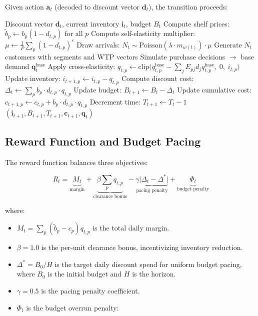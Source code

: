 \documentclass[11pt,a4paper]{article}
\begin{document}
Given action $\mathbf{a}_t$ (decoded to discount vector $\mathbf{d}_t$), the transition proceeds:

\begin{algorithm}[H]
\caption{Single-step transition dynamics}
\begin{algorithmic}[1]
\Require Discount vector $\mathbf{d}_t$, current inventory $\mathbf{i}_t$, budget $B_t$
\State Compute shelf prices: $\tilde{b}_p \gets b_p (1 - d_{t,p})$ for all $p$
\State Compute self-elasticity multiplier: $\mu \gets \frac{1}{P}\sum_p (1 - d_{t,p})^{\varepsilon}$
\State Draw arrivals: $N_t \sim \text{Poisson}(\lambda \cdot m_{w(t)}) \cdot \mu$
\State Generate $N_t$ customers with segments and WTP vectors
\State Simulate purchase decisions $\rightarrow$ base demand $\mathbf{q}^{\text{base}}_t$
\State Apply cross-elasticity: $q_{t,p} \gets \text{clip}\bigl(q^{\text{base}}_{t,p} - \sum_j E_{pj} d_j q^{\text{base}}_{t,p},\; 0,\; i_{t,p}\bigr)$
\State Update inventory: $i_{t+1,p} \gets i_{t,p} - q_{t,p}$
\State Compute discount cost: $\Delta_t \gets \sum_p b_p \cdot d_{t,p} \cdot q_{t,p}$
\State Update budget: $B_{t+1} \gets B_t - \Delta_t$
\State Update cumulative cost: $c_{t+1,p} \gets c_{t,p} + b_p \cdot d_{t,p} \cdot q_{t,p}$
\State Decrement time: $T_{t+1} \gets T_t - 1$
\State \Return $(\mathbf{i}_{t+1}, B_{t+1}, T_{t+1}, \mathbf{c}_{t+1}, \mathbf{q}_t)$
\end{algorithmic}
\end{algorithm}

\subsection{Reward Function and Budget Pacing}

The reward function balances three objectives:

\begin{equation}
\boxed{
R_t = \underbrace{M_t}_{\text{margin}} + \underbrace{\beta \sum_p q_{t,p}}_{\text{clearance bonus}} - \underbrace{\gamma \bigl|\Delta_t - \Delta^*\bigr|}_{\text{pacing penalty}} + \underbrace{\Phi_t}_{\text{budget penalty}}
}
\label{eq:reward}
\end{equation}

where:
\begin{itemize}
    \item $M_t = \sum_p (\tilde{b}_p - c_p) q_{t,p}$ is the total daily margin.
    \item $\beta = 1.0$ is the per-unit clearance bonus, incentivizing inventory reduction.
    \item $\Delta^* = B_0 / H$ is the target daily discount spend for uniform budget pacing, where $B_0$ is the initial budget and $H$ is the horizon.
    \item $\gamma = 0.5$ is the pacing penalty coefficient.
    \item $\Phi_t$ is the budget overrun penalty:
\end{itemize}
\end{document}

